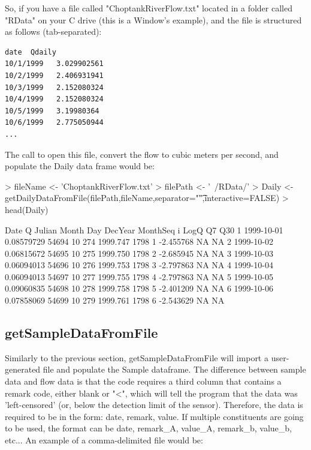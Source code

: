 \documentclass[a4paper,11pt]{article}
\begin{document}
So, if you have a file called "ChoptankRiverFlow.txt" located in a folder called "RData" on your C drive (this is a Window's example), and the file is structured as follows (tab-separated):
\begin{verbatim}
date  Qdaily
10/1/1999	3.029902561
10/2/1999	2.406931941
10/3/1999	2.152080324
10/4/1999	2.152080324
10/5/1999	3.19980364
10/6/1999	2.775050944
...
\end{verbatim}

The call to open this file, convert the flow to cubic meters per second, and populate the Daily data frame would be:
\begin{Schunk}
\begin{Sinput}
> fileName <- 'ChoptankRiverFlow.txt'
> filePath <-  '~/RData/'
> Daily <- getDailyDataFromFile(filePath,fileName,separator="\t",interactive=FALSE)
> head(Daily)
\end{Sinput}
\begin{Soutput}
        Date          Q Julian Month Day  DecYear MonthSeq i      LogQ Q7 Q30
1 1999-10-01 0.08579729  54694    10 274 1999.747     1798 1 -2.455768 NA  NA
2 1999-10-02 0.06815672  54695    10 275 1999.750     1798 2 -2.685945 NA  NA
3 1999-10-03 0.06094013  54696    10 276 1999.753     1798 3 -2.797863 NA  NA
4 1999-10-04 0.06094013  54697    10 277 1999.755     1798 4 -2.797863 NA  NA
5 1999-10-05 0.09060835  54698    10 278 1999.758     1798 5 -2.401209 NA  NA
6 1999-10-06 0.07858069  54699    10 279 1999.761     1798 6 -2.543629 NA  NA
\end{Soutput}
\end{Schunk}

\subsection{getSampleDataFromFile}
Similarly to the previous section, getSampleDataFromFile will import a user-generated file and populate the Sample dataframe. The difference between sample data and flow data is that the code requires a third column that contains a remark code, either blank or "<", which will tell the program that the data was 'left-censored' (or, below the detection limit of the sensor). Therefore, the data is required to be in the form: date, remark, value.  If multiple constituents are going to be used, the format can be date, remark_A, value_A, remark_b, value_b, etc... An example of a comma-delimited file would be:
\end{document}
